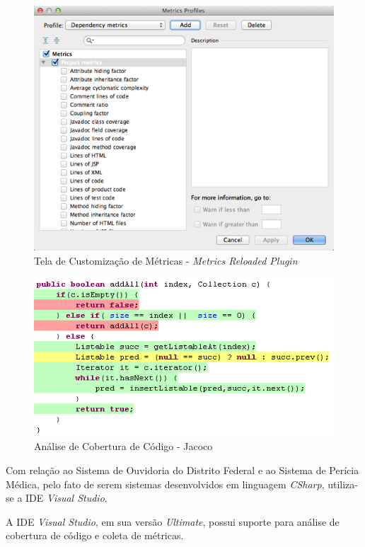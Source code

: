 \begin{figure}[h]
\includegraphics[width=\textwidth]{figuras/metricsReloaded.png}
\caption{Tela de Customização de Métricas - \textit{Metrics Reloaded Plugin}}
\label{fig:metricsReloaded}
\end{figure}

\begin{figure}[h]
\includegraphics[width=\textwidth]{figuras/jacoco.png}
\caption{Análise de Cobertura de Código - Jacoco}
\label{fig:jacoco}
\end{figure}

\clearpage

Com relação ao Sistema de Ouvidoria do Distrito Federal e ao Sistema de Perícia Médica, pelo fato de serem sistemas desenvolvidos em linguagem \textit{CSharp}, utiliza-se a IDE \textit{Visual Studio}.

A IDE \textit{Visual Studio}, em sua versão \textit{Ultimate}, possui suporte para análise de cobertura de código e coleta de métricas.

